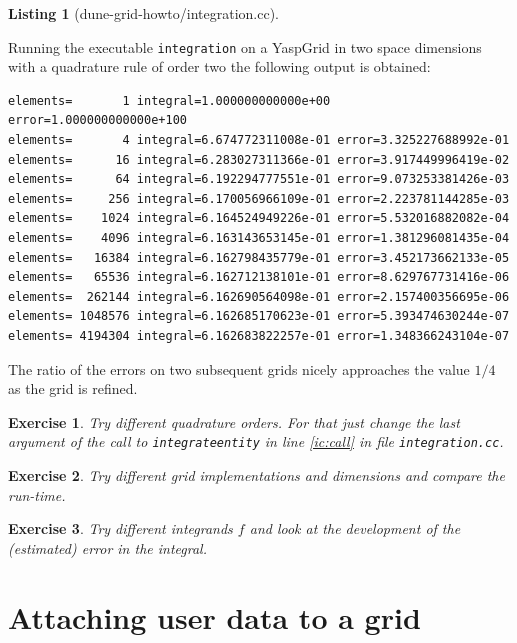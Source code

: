 \documentclass[11pt,a4paper,headinclude,footinclude,DIV16,normalheadings]{scrreprt}
\newtheorem{exc}{Exercise}[chapter]
\newtheorem{lst}{Listing}
\begin{document}
\begin{lst}[dune-grid-howto/integration.cc] \mbox{}


\end{lst}

Running the executable \lstinline!integration! on a YaspGrid in two
space dimensions with a quadrature rule of order
two the following output is obtained:

\begin{lstlisting}[basicstyle=\ttfamily\scriptsize]
elements=       1 integral=1.000000000000e+00 error=1.000000000000e+100
elements=       4 integral=6.674772311008e-01 error=3.325227688992e-01
elements=      16 integral=6.283027311366e-01 error=3.917449996419e-02
elements=      64 integral=6.192294777551e-01 error=9.073253381426e-03
elements=     256 integral=6.170056966109e-01 error=2.223781144285e-03
elements=    1024 integral=6.164524949226e-01 error=5.532016882082e-04
elements=    4096 integral=6.163143653145e-01 error=1.381296081435e-04
elements=   16384 integral=6.162798435779e-01 error=3.452173662133e-05
elements=   65536 integral=6.162712138101e-01 error=8.629767731416e-06
elements=  262144 integral=6.162690564098e-01 error=2.157400356695e-06
elements= 1048576 integral=6.162685170623e-01 error=5.393474630244e-07
elements= 4194304 integral=6.162683822257e-01 error=1.348366243104e-07
\end{lstlisting}

The ratio of the errors on two subsequent grids nicely approaches the
value $1/4$ as the grid is refined.


\begin{exc} Try different quadrature orders. For that just change the
  last argument of the call to \lstinline!integrateentity! in line
  \ref{ic:call} in file \lstinline!integration.cc!.
\end{exc}

\begin{exc} Try different grid implementations and dimensions and
  compare the run-time.
\end{exc}

\begin{exc} Try different integrands $f$ and look at the development
  of the (estimated) error in the integral. 
\end{exc}

\chapter{Attaching user data to a grid}
\end{document}

